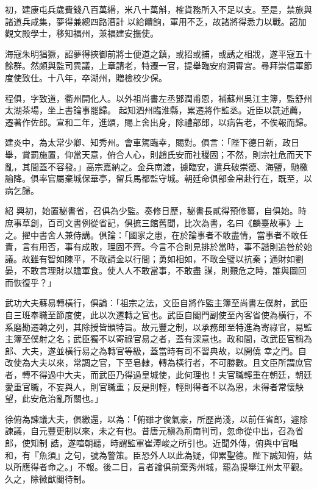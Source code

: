 \begin{pinyinscope}
 初，建康屯兵歲費錢八百萬緡，米八十萬斛，榷貨務所入不足以支。至是，禁旅與諸道兵咸集，夢得兼總四路漕計
 以給饋餉，軍用不乏，故諸將得悉力以戰。詔加觀文殿學士，移知福州，兼福建安撫使。



 海寇朱明猖獗，詔夢得挾御前將士便道之鎮，或招或捕，或誘之相戕，遂平寇五十餘群。然頗與監司異議，上章請老，特遷一官，提舉臨安府洞霄宮。尋拜崇信軍節度使致仕。十八年，卒湖州，贈檢校少保。



 程俱，字致道，衢州開化人。以外祖尚書左丞鄧潤甫恩，補蘇州吳江主簿，監舒州太湖茶場，坐上書論事罷歸。
 起知泗州臨淮縣，累遷將作監丞。近臣以詵述薦，遷著作佐郎。宣和二年，進頌，賜上舍出身，除禮部郎，以病告老，不俟報而歸。



 建炎中，為太常少卿、知秀州。會車駕臨幸，賜對。俱言：「陛下德日新，政日舉，賞罰施置，仰當天意，俯合人心，則趙氏安而社稷固；不然，則宗社危而天下亂，其間蓋不容發。」高宗嘉納之。金兵南渡，據臨安，遣兵破崇德、海鹽，馳檄諭降。俱率官屬棄城保華亭，留兵馬都監守城。朝廷命俱部金帛赴行在，既至，以病乞歸。



 紹
 興初，始置秘書省，召俱為少監。奏修日歷，秘書長貳得預修纂，自俱始。時庶事草創，百司文書例從省記，俱摭三館舊聞，比次為書，名曰《麟臺故事》上之。擢中書舍人兼侍講。俱論：「國家之患，在於論事者不敢盡情，當事者不敢任責，言有用否，事有成敗，理固不齊。今言不合則見排於當時，事不諧則追咎於始議。故雖有智如陳平，不敢請金以行間；勇如相如，不敢全璧以抗秦；通財如劉晏，不敢言理財以贍軍食。使人人不敢當事，不敢盡
 謀，則艱危之時，誰與圖回而恢復乎？」



 武功大夫蘇易轉橫行，俱論：「祖宗之法，文臣自將作監主簿至尚書左僕射，武臣自三班奉職至節度使，此以次遷轉之官也。武臣自閣門副使至內客省使為橫行，不系磨勘遷轉之列，其除授皆頒特旨。故元豐之制，以承務郎至特進為寄祿官，易監主簿至僕射之名；武臣獨不以寄祿官易之者，蓋有深意也。政和間，改武臣官稱為郎、大夫，遂並橫行易之為轉官等級，蓋當時有司不習典故，以開僥
 幸之門。自改使為大夫以來，常調之官，下至皂隸，轉為橫行者，不可勝數。且文臣所謂庶官者，轉不得過中大夫，而武臣乃得過皇城使，此何理也！夫官職輕重在朝廷，朝廷愛重官職，不妄與人，則官職重；反是則輕，輕則得者不以為恩，未得者常懷觖望，此安危治亂所關也。」



 徐俯為諫議大夫，俱繳還，以為：「俯雖才俊氣豪，所歷尚淺，以前任省郎，遽除諫議，自元豐更制以來，未之有也。昔唐元稹為荊南判司，忽命從中出，召為省郎，使知制
 誥，遂喧朝聽，時謂監軍崔潭峻之所引也。近聞外傳，俯與中官唱和，有『魚須』之句，號為警策。臣恐外人以此為疑，仰累聖德。陛下誠知俯，姑以所應得者命之。」不報。後二日，言者論俱前棄秀州城，罷為提舉江州太平觀。久之，除徽猷閣待制。




\end{pinyinscope}

